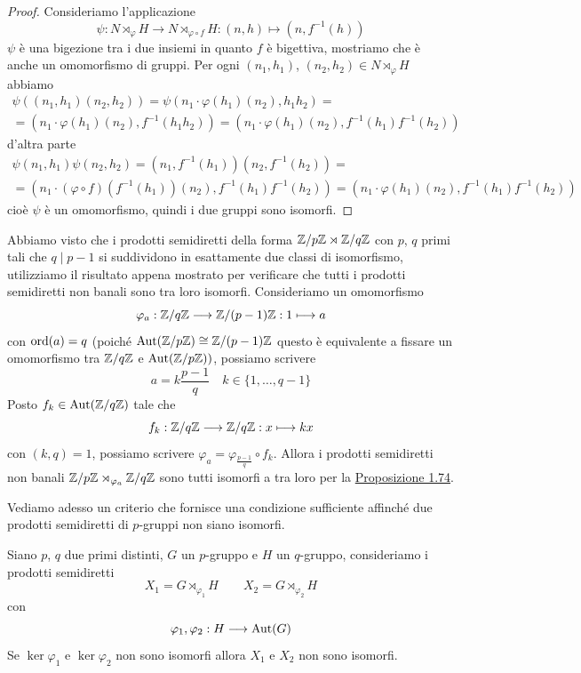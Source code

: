 \documentclass[11pt]{scrartcl}
\begin{document}
	\begin{proof}
		Consideriamo l'applicazione
		\[
		\psi: N\rtimes_{\varphi}H \longrightarrow N\rtimes_{\varphi\circ f}H:
		(n, h) \longmapsto (n, f^{-1}(h))
		\]
		$\psi$ è una bigezione tra i due insiemi in quanto $f$ è bigettiva,
		mostriamo che è anche un omomorfismo di gruppi. Per ogni $(n_1, h_1)$, $(n_2, h_2)
		\in N\rtimes_{\varphi}H$ abbiamo
		\begin{multline*}
			\psi((n_1, h_1)(n_2, h_2)) = \psi(n_1\cdot\varphi(h_1)(n_2), h_1h_2) = \\
			= (n_1\cdot\varphi(h_1)(n_2), f^{-1}(h_1h_2)) = (n_1\cdot\varphi(h_1)(n_2), f^{-1}(h_1)f^{-1}(h_2))
		\end{multline*}
		d'altra parte
		\begin{multline*}
			\psi(n_1, h_1)\psi(n_2, h_2) = (n_1, f^{-1}(h_1))(n_2, f^{-1}(h_2)) =\\
			= (n_1\cdot(\varphi\circ f)(f^{-1}(h_1))(n_2), f^{-1}(h_1)f^{-1}(h_2)) = 
			(n_1\cdot \varphi(h_1)(n_2), f^{-1}(h_1)f^{-1}(h_2))
		\end{multline*}
		cioè $\psi$ è un omomorfismo, quindi i due gruppi sono isomorfi.
	\end{proof}
	
	\begin{example}
		Abbiamo visto che i prodotti semidiretti della forma ${\mathbb Z}/p{\mathbb Z} \rtimes\mathbb{Z}/{q}\mathbb{Z}$
		con $p$, $q$ primi tali che $q \mid p - 1$ si suddividono in esattamente
		due classi di isomorfismo, utilizziamo il risultato appena mostrato 
		per verificare che tutti i prodotti semidiretti non banali sono tra loro 
		isomorfi. Consideriamo un omomorfismo
		\[
		\varphi_a: \mathbb{Z}/{q}\mathbb{Z}\longrightarrow \mathbb{Z}/{(p - 1)}\mathbb{Z} : 1 \longmapsto a
		\]
		con $\operatorname{ord}(a) = q$ (poiché $\operatorname{Aut}({\mathbb Z}/p{\mathbb Z}) \cong \mathbb{Z}/{(p - 1)}\mathbb{Z}$
		questo è equivalente a fissare un omomorfismo tra $\mathbb{Z}/{q}\mathbb{Z}$ e $\operatorname{Aut}({\mathbb Z}/p{\mathbb Z}))$,
		possiamo scrivere 
		\[
		a = k\frac{p - 1}{q}\quad k \in \{1, \ldots, q - 1\}
		\]
		Posto $f_k \in \operatorname{Aut}(\mathbb{Z}/{q}\mathbb{Z})$ tale che
		\[
		f_k :\mathbb{Z}/{q}\mathbb{Z}\longrightarrow\mathbb{Z}/{q}\mathbb{Z}: x \longmapsto kx
		\]
		con $(k, q) = 1$, possiamo scrivere 
		$\varphi_a = \varphi_{\frac{p - 1}{q}}\circ f_k$. Allora i prodotti
		semidiretti non banali ${\mathbb Z}/p{\mathbb Z}\rtimes_{\varphi_a}\mathbb{Z}/{q}\mathbb{Z}$ sono tutti isomorfi
		a tra loro per la \hyperref[prop1.74]{Proposizione 1.74}.
	\end{example}
	
	Vediamo adesso un criterio che fornisce una condizione sufficiente affinché
	due prodotti semidiretti di $p$-gruppi non siano isomorfi.
	
	\begin{proposition}
		Siano $p$, $q$ due primi distinti, $G$ un $p$-gruppo e $H$ un $q$-gruppo,
		consideriamo i prodotti semidiretti 
		\[
		X_1 = G\rtimes_{\varphi_1}H \qquad X_2 = G\rtimes_{\varphi_2}H
		\]
		con 
		\[
		\varphi_1, \varphi_2 :H \longrightarrow \operatorname{Aut}(G)
		\]
		Se $\ker\varphi_1$ e $\ker\varphi_2$ non sono isomorfi allora $X_1$ e 
		$X_2$ non sono isomorfi.
	\end{proposition}
	
\end{document}
